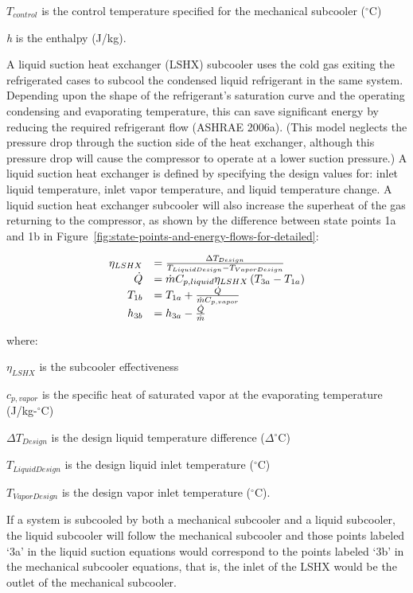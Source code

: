 \(T_{control}\) is the control temperature specified for the mechanical subcooler (\(^{\circ}\)C)

\emph{h} is the enthalpy (J/kg).

A liquid suction heat exchanger (LSHX) subcooler uses the cold gas exiting the refrigerated cases to subcool the condensed liquid refrigerant in the same system. Depending upon the shape of the refrigerant's saturation curve and the operating condensing and evaporating temperature, this can save significant energy by reducing the required refrigerant flow (ASHRAE 2006a). (This model neglects the pressure drop through the suction side of the heat exchanger, although this pressure drop will cause the compressor to operate at a lower suction pressure.) A liquid suction heat exchanger is defined by specifying the design values for: inlet liquid temperature, inlet vapor temperature, and liquid temperature change. A liquid suction heat exchanger subcooler will also increase the superheat of the gas returning to the compressor, as shown by the difference between state points 1a and 1b in Figure~\ref{fig:state-points-and-energy-flows-for-detailed}:

\begin{equation}
  \begin{array}{rl}
    \eta_{LSHX} &= \frac{\Delta T_{Design}}{T_{Liquid Design} - T_{Vapor Design}} \\
    \dot{Q} &= \dot{m} C_{p,liquid} \eta_{LSHX} \left(T_{3a} - T_{1a}\right) \\
    T_{1b} &= T_{1a} + \frac{\dot{Q}}{\dot{m}C_{p,vapor}} \\
    h_{3b} &= h_{3a} - \frac{\dot{Q}}{\dot{m}}
  \end{array}
\end{equation}

where:

\({\eta_{LSHX}}\) is the subcooler effectiveness

\(c_{p,vapor}\) is the specific heat of saturated vapor at the evaporating temperature (J/kg-\(^{\circ}\)C)

\(\Delta T_{Design}\) is the design liquid temperature difference (\(\Delta^{\circ}\)C)

\(T_{LiquidDesign}\) is the design liquid inlet temperature (\(^{\circ}\)C)

\(T_{VaporDesign}\) is the design vapor inlet temperature (\(^{\circ}\)C).

If a system is subcooled by both a mechanical subcooler and a liquid subcooler, the liquid subcooler will follow the mechanical subcooler and those points labeled `3a' in the liquid suction equations would correspond to the points labeled `3b' in the mechanical subcooler equations, that is, the inlet of the LSHX would be the outlet of the mechanical subcooler.

